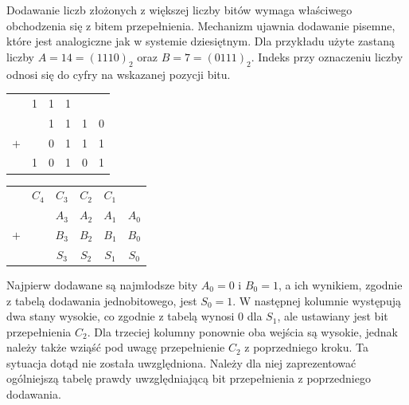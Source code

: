 \documentclass[a4paper,12pt]{article}
\begin{document}
Dodawanie liczb złożonych z większej liczby bitów wymaga właściwego obchodzenia się z bitem przepełnienia. Mechanizm ujawnia dodawanie pisemne, które jest analogiczne jak w systemie dziesiętnym. Dla przykładu użyte zastaną liczby $A = 14 = (1110)_2$ oraz $B = 7 = (0111)_2$. Indeks przy oznaczeniu liczby odnosi się do cyfry na wskazanej pozycji bitu.

\begin{table}[h!]
\centering

\begin{minipage}{5.5cm}
\centering

\begin{tabular}{  c  c  c  c  c  c  }
      & 1 & 1 & 1 &   &   \\
      &   & 1 & 1 & 1 & 0 \\
  $+$ &   & 0 & 1 & 1 & 1 \\
  \hline
      & 1 & 0 & 1 & 0 & 1 \\
\end{tabular}
\end{minipage}
\begin{minipage}{11cm}
\begin{tabular}{  c  c  c  c  c  c  }
      & $C_4$ & $C_3$ & $C_2$ & $C_1$ &       \\
      &       & $A_3$ & $A_2$ & $A_1$ & $A_0$ \\
  $+$ &       & $B_3$ & $B_2$ & $B_1$ & $B_0$ \\
  \hline
      &       & $S_3$ & $S_2$ & $S_1$ & $S_0$ \\
\end{tabular}
\end{minipage}
\end{table}

Najpierw dodawane są najmłodsze bity $A_0 = 0$ i $B_0 = 1$, a ich wynikiem, zgodnie z tabelą dodawania jednobitowego, jest $S_0 = 1$. W następnej kolumnie występują dwa stany wysokie, co zgodnie z tabelą wynosi $0$ dla $S_1$, ale ustawiany jest bit przepełnienia $C_2$. Dla trzeciej kolumny ponownie oba wejścia są wysokie, jednak należy także wziąść pod uwagę przepełnienie $C_2$ z poprzedniego kroku. Ta sytuacja dotąd nie została uwzględniona. Należy dla niej zaprezentować ogólniejszą tabelę prawdy uwzględniającą bit przepełnienia z poprzedniego dodawania.
\end{document}

